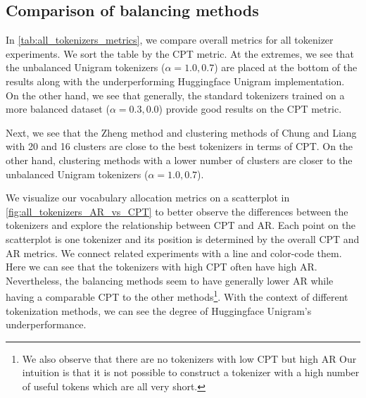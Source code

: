 \subsection{Comparison of balancing methods}
\label{sec:comparison_balancing_methods}



In \autoref{tab:all_tokenizers_metrics}, we compare overall metrics for all tokenizer experiments. We sort the table by the CPT metric. At the extremes, we see that the unbalanced Unigram tokenizers ($\alpha=1.0, 0.7$) are placed at the bottom of the results along with the underperforming Huggingface Unigram implementation. On the other hand, we see that generally, the standard tokenizers trained on a more balanced dataset ($\alpha=0.3, 0.0$) provide good results on the CPT metric. 

Next, we see that the Zheng method and clustering methods of Chung and Liang with 20 and 16 clusters are close to the best tokenizers in terms of CPT. On the other hand, clustering methods with a lower number of clusters are closer to the unbalanced Unigram tokenizers ($\alpha=1.0, 0.7$).

We visualize our vocabulary allocation metrics on a scatterplot in \autoref{fig:all_tokenizers_AR_vs_CPT} to better observe the differences between the tokenizers and explore the relationship between CPT and AR. Each point on the scatterplot is one tokenizer and its position is determined by the overall CPT and AR metrics. We connect related experiments with a line and color-code them. Here we can see that the tokenizers with high CPT often have high AR. Nevertheless, the balancing methods seem to have generally lower AR while having a comparable CPT to the other methods\footnote{We also observe that there are no tokenizers with low CPT but high AR Our intuition is that it is not possible to construct a tokenizer with a high number of useful tokens which are all very short.}. With the context of different tokenization methods, we can see the degree of Huggingface Unigram's underperformance.

